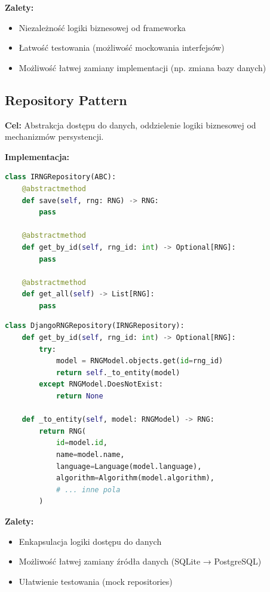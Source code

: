 \documentclass[12pt,a4paper]{article}
\begin{document}
\textbf{Zalety:}
\begin{itemize}
    \item Niezależność logiki biznesowej od frameworka
    \item Łatwość testowania (możliwość mockowania interfejsów)
    \item Możliwość łatwej zamiany implementacji (np. zmiana bazy danych)
\end{itemize}

\subsection{Repository Pattern}

\textbf{Cel:} Abstrakcja dostępu do danych, oddzielenie logiki biznesowej od mechanizmów persystencji.

\textbf{Implementacja:}

\begin{lstlisting}[language=Python, caption=Interface repozytorium]
class IRNGRepository(ABC):
    @abstractmethod
    def save(self, rng: RNG) -> RNG:
        pass
    
    @abstractmethod
    def get_by_id(self, rng_id: int) -> Optional[RNG]:
        pass
    
    @abstractmethod
    def get_all(self) -> List[RNG]:
        pass
\end{lstlisting}

\begin{lstlisting}[language=Python, caption=Implementacja dla Django ORM]
class DjangoRNGRepository(IRNGRepository):
    def get_by_id(self, rng_id: int) -> Optional[RNG]:
        try:
            model = RNGModel.objects.get(id=rng_id)
            return self._to_entity(model)
        except RNGModel.DoesNotExist:
            return None
    
    def _to_entity(self, model: RNGModel) -> RNG:
        return RNG(
            id=model.id,
            name=model.name,
            language=Language(model.language),
            algorithm=Algorithm(model.algorithm),
            # ... inne pola
        )
\end{lstlisting}

\textbf{Zalety:}
\begin{itemize}
    \item Enkapsulacja logiki dostępu do danych
    \item Możliwość łatwej zamiany źródła danych (SQLite → PostgreSQL)
    \item Ułatwienie testowania (mock repositories)
\end{itemize}
\end{document}

